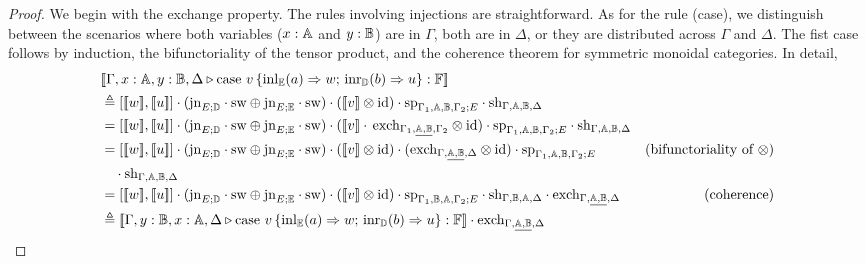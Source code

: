 \documentclass[10pt,a4paper]{amsart}
\theoremstyle{definition}
\theoremstyle{definition}
\theoremstyle{definition}
\theoremstyle{definition}
\theoremstyle{definition}
\theoremstyle{definition}
\begin{document}
\begin{proof}
  We begin with the exchange property. The rules involving injections are
  straightforward. As for the rule  (case), we distinguish between the
  scenarios where both variables ($x : \mathbb{A}$ and $y : \mathbb{B}$) are in
  $\Gamma$, both are in $\Delta$, or they are distributed across $\Gamma$ and
  $\Delta$.  The fist case follows by induction, the bifunctoriality of the
  tensor product, and the coherence theorem for symmetric monoidal categories.
  In detail,
  \begin{align*}
    & [\![\Gamma,x:\typeA, y:\typeB, \Delta \vljud \text{case }  v\,  \{\text{inl}_{\typeE} (a) \Rightarrow w ;\, \text{inr}_{\typeD} (b) \Rightarrow u\}: \typeF]\!] \\ 
    &\triangleq     \left[[\![ w ]\!] ,[\![ u ]\!]\right] \comp (\text{jn}_{E;\typeD}\comp \sw \oplus \text{jn}_{E;\typeE } \comp \sw) \comp ([\![ v  ]\!] \otimes \text{id})  \comp \text{sp}_{\Gamma_{1},\typeA, \typeB,\Gamma_{2};E} \comp \text{sh}_{\Gamma,\typeA, \typeB,\Delta} \\
    & =  \left[[\![ w ]\!] ,[\![ u ]\!]\right] \comp (\text{jn}_{E;\typeD}\comp \sw \oplus \text{jn}_{E;\typeE } \comp \sw)  \comp ([\![v]\! ]\comp\, \text{exch}_{\Gamma_{1}, \underline{\typeA,\typeB},\Gamma_{2}} \otimes \text{id}) \comp \text{sp}_{\Gamma_{1},\typeA, \typeB,\Gamma_{2};E} \comp \text{sh}_{\Gamma,\typeA, \typeB,\Delta} \\
    &  =  \left[[\![ w ]\!] ,[\![ u ]\!]\right] \comp (\text{jn}_{E;\typeD}\comp \sw \oplus \text{jn}_{E;\typeE } \comp \sw)  \comp ([\![ v ]\!]\otimes \text{id}) \comp (\text{exch}_{\Gamma,  \underline{\typeA,  \typeB}, \Delta} \otimes \text{id}) \comp \text{sp}_{\Gamma_{1},\typeA,\typeB, \Gamma_{2};E}  & {\text{(bifunctoriality of $\otimes$)}}\\
    & \hspace{10pt} \comp  \text{sh}_{\Gamma,\typeA, \typeB,\Delta} \\
    & =    \left[[\![ w ]\!] ,[\![ u ]\!]\right] \comp (\text{jn}_{E;\typeD}\comp \sw \oplus \text{jn}_{E;\typeE } \comp \sw)   \comp ([\![v]\!]\otimes \text{id}) \comp \text{sp}_{\Gamma_{1},\typeB,\typeA, \Gamma_{2};E}  \comp \text{sh}_{\Gamma,\typeB, \typeA,\Delta}  \comp \text{exch}_{\Gamma,  \underline{\typeA,\typeB}, \Delta} & {\text{(coherence)}} \\
    & \triangleq   [\![\Gamma,y:\typeB, x:\typeA, \Delta \vljud \text{case } v\,  \{\text{inl}_{\typeE} (a) \Rightarrow w ;\, \text{inr}_{\typeD} (b) \Rightarrow u\}: \typeF]\!] \comp \text{exch}_{\Gamma,  \underline{\typeA, \typeB}, \Delta}
  \end{align*}



\end{proof}
\end{document}
